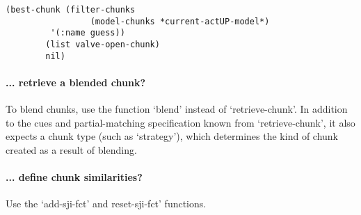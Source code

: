 \documentclass{article}
\begin{document}
\begin{verbatim}
(best-chunk (filter-chunks 
                 (model-chunks *current-actUP-model*)
		 '(:name guess))
	    (list valve-open-chunk) 
	    nil)
\end{verbatim}



\paragraph {... retrieve a blended chunk?}

To blend chunks, use the function `blend' instead of `retrieve-chunk'.
In addition to the cues and partial-matching specification known from `retrieve-chunk', it also expects a chunk type (such as `strategy'), which determines the kind of chunk created as a result of blending.




\paragraph {... define chunk similarities?}

Use the `add-sji-fct' and reset-sji-fct' functions.
\end{document}
